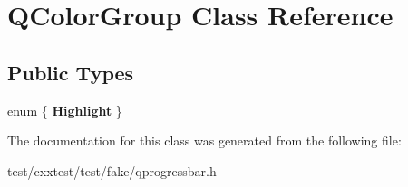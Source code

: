 \hypertarget{classQColorGroup}{\section{Q\-Color\-Group Class Reference}
\label{classQColorGroup}
}
\subsection*{Public Types}
\begin{DoxyCompactItemize}
\item 
enum \{ {\bfseries Highlight}
 \}
\end{DoxyCompactItemize}


The documentation for this class was generated from the following file\-:\begin{DoxyCompactItemize}
\item 
test/cxxtest/test/fake/qprogressbar.\-h\end{DoxyCompactItemize}

